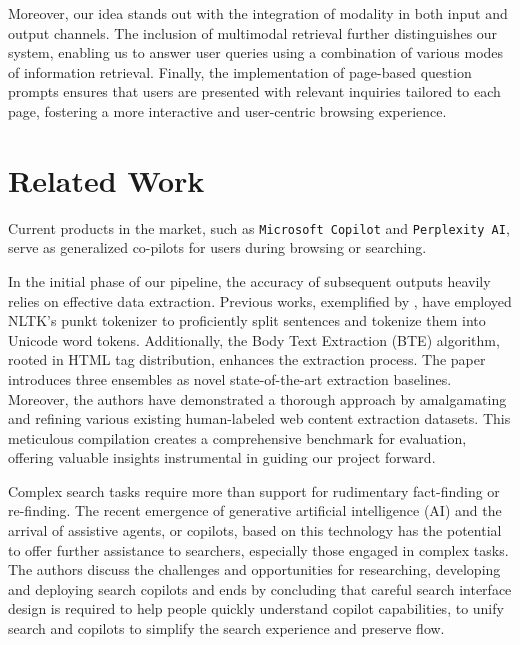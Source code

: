 \documentclass[sigconf,natbib=true,anonymous=false]{acmart}
\begin{document}
Moreover, our idea stands out with the integration of modality in both input and output channels. The inclusion of multimodal retrieval further distinguishes our system, enabling us to answer user queries using a combination of various modes of information retrieval. Finally, the implementation of page-based question prompts ensures that users are presented with relevant inquiries tailored to each page, fostering a more interactive and user-centric browsing experience.

\section{Related Work}
Current products in the market, such as \verb|Microsoft Copilot| and \verb|Perplexity AI|, serve as generalized co-pilots for users during browsing or searching.

In the initial phase of our pipeline, the accuracy of subsequent outputs heavily relies on effective data extraction. Previous works, exemplified by \cite{10.1145/3539618.3591920}, have employed NLTK's punkt tokenizer to proficiently split sentences and tokenize them into Unicode word tokens. Additionally, the Body Text Extraction (BTE) algorithm, rooted in HTML tag distribution, enhances the extraction process. The paper introduces three ensembles as novel state-of-the-art extraction baselines. Moreover, the authors have demonstrated a thorough approach by amalgamating and refining various existing human-labeled web content extraction datasets. This meticulous compilation creates a comprehensive benchmark for evaluation, offering valuable insights instrumental in guiding our project forward.

Complex search tasks require more than support for rudimentary fact-finding or re-finding. The recent emergence of generative artificial intelligence (AI) and the arrival of assistive agents, or copilots, based on this technology has the potential to offer further assistance to searchers, especially those engaged in complex tasks. The authors \textbf{\cite{10.1145/3642979.3642985}} discuss the challenges and opportunities for researching, developing and deploying search copilots and ends by concluding that careful search interface design is required to help people quickly understand copilot capabilities, to unify search and copilots to simplify the search experience and preserve flow.
\end{document}
